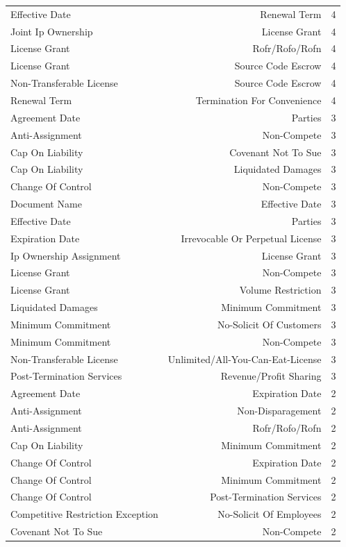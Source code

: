 \begin{tabular}{lrr}
Effective Date & Renewal Term & 4 \\
Joint Ip Ownership & License Grant & 4 \\
License Grant & Rofr/Rofo/Rofn & 4 \\
License Grant & Source Code Escrow & 4 \\
Non-Transferable License & Source Code Escrow & 4 \\
Renewal Term & Termination For Convenience & 4 \\
Agreement Date & Parties & 3 \\
Anti-Assignment & Non-Compete & 3 \\
Cap On Liability & Covenant Not To Sue & 3 \\
Cap On Liability & Liquidated Damages & 3 \\
Change Of Control & Non-Compete & 3 \\
Document Name & Effective Date & 3 \\
Effective Date & Parties & 3 \\
Expiration Date & Irrevocable Or Perpetual License & 3 \\
Ip Ownership Assignment & License Grant & 3 \\
License Grant & Non-Compete & 3 \\
License Grant & Volume Restriction & 3 \\
Liquidated Damages & Minimum Commitment & 3 \\
Minimum Commitment & No-Solicit Of Customers & 3 \\
Minimum Commitment & Non-Compete & 3 \\
Non-Transferable License & Unlimited/All-You-Can-Eat-License & 3 \\
Post-Termination Services & Revenue/Profit Sharing & 3 \\
Agreement Date & Expiration Date & 2 \\
Anti-Assignment & Non-Disparagement & 2 \\
Anti-Assignment & Rofr/Rofo/Rofn & 2 \\
Cap On Liability & Minimum Commitment & 2 \\
Change Of Control & Expiration Date & 2 \\
Change Of Control & Minimum Commitment & 2 \\
Change Of Control & Post-Termination Services & 2 \\
Competitive Restriction Exception & No-Solicit Of Employees & 2 \\
Covenant Not To Sue & Non-Compete & 2 \\

\end{tabular}
